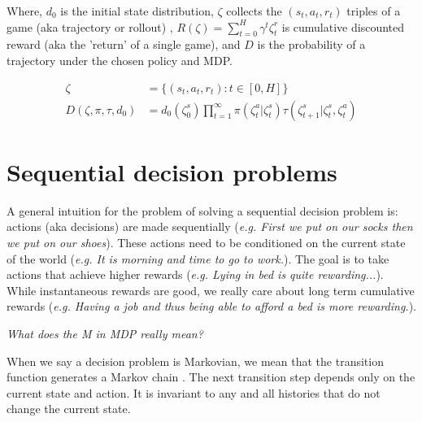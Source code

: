 Where, $d_0$ is the initial state distribution, $\zeta$ collects the $(s_t, a_t, r_t)$ triples of a game (aka trajectory or rollout) \footnotemark[17],
$R(\zeta) =\sum_{t=0}^H \gamma^t \zeta^r_t$ is cumulative discounted reward (aka the 'return' of a single game), and $D$ is the probability of a trajectory under the chosen policy and MDP.


\begin{align}
\zeta &= \{(s_t, a_t, r_t) : t \in [0, H]\} \tag{trajectory} \\
D(\zeta, \pi, \tau, d_0) &= d_0(\zeta^s_0) \prod_{t=1}^{\infty} \pi(\zeta^a_t|\zeta^s_t) \tau(\zeta^s_{t+1}|\zeta^s_t, \zeta^a_t) \tag{p($\zeta$)}
\end{align}


\section{Sequential decision problems}

A general intuition for the problem of solving a sequential decision problem is: actions (aka decisions) are made
sequentially (\textit{e.g. First we put on our socks then we put on our shoes}).
These actions need to be conditioned on the current state of the world (\textit{e.g. It is morning and time to go to work.}).
The goal is to take actions that achieve higher rewards (\textit{e.g. Lying in bed is quite rewarding...}). While instantaneous
rewards are good, we really care about long term cumulative rewards (\textit{e.g. Having a job and thus being able to afford a bed is more rewarding.}).


\begin{displayquote}
  \textsl{What does the M in MDP really mean?}
\end{displayquote}

When we say a decision problem is Markovian, we mean that the transition
function generates a Markov chain \cite{Markov2006}. The next transition step depends only
on the current state and action. It is invariant to any and all histories that do not
change the current state. \footnotemark[18]


